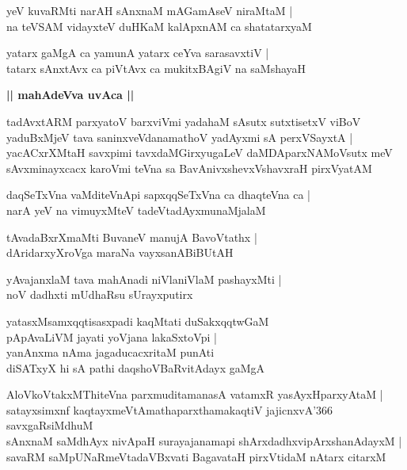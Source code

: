 \documentclass[twoside,12pt,openright]{book}
\newcounter{shloka}[chapter]
\def\uvaca#1{\centerline{{\large\textbf{#1}}}}
\begin{document}
\begin{shloka}%
yeV kuvaRMti narAH sAnxnaM mAGamAseV niraMtaM |\\
na teVSAM vidayxteV duHKaM kalApxnAM ca shatatarxyaM 
\end{shloka}

\begin{shloka}%
yatarx gaMgA ca yamunA yatarx ceYva sarasavxtiV |\\
tatarx sAnxtAvx ca piVtAvx ca mukitxBAgiV na saMshayaH 
\end{shloka}

\uvaca{|| mahAdeVva uvAca ||}

\begin{shloka}%
tadAvxtARM parxyatoV barxviVmi yadahaM sAsutx sutxtisetxV viBoV \\
yaduBxMjeV tava saninxveVdanamathoV yadAyxmi sA perxVSayxtA |\\
yacACxrXMtaH savxpimi tavxdaMGirxyugaLeV daMDAparxNAMoVsutx meV \\
sAvxminayxcacx karoVmi teVna sa BavAnivxshevxVshavxraH pirxVyatAM
\end{shloka}

\begin{shloka}%
daqSeTxVna vaMditeVnApi sapxqqSeTxVna ca dhaqteVna ca |\\
narA yeV na vimuyxMteV tadeVtadAyxmunaMjalaM 
\end{shloka}

\begin{shloka}%
tAvadaBxrXmaMti BuvaneV manujA BavoVtathx |\\
dAridarxyXroVga maraNa vayxsanABiBUtAH
\end{shloka}

\begin{shloka}%
yAvajanxlaM tava mahAnadi niVlaniVlaM pashayxMti |\\
noV dadhxti mUdhaRsu sUrayxputirx
\end{shloka}

\begin{shloka}%
yatasxMsamxqqtisasxpadi kaqMtati duSakxqqtwGaM \\
pApAvaLiVM jayati yoVjana lakaSxtoVpi |\\
yanAnxma nAma jagaducacxritaM punAti \\
diSATxyX hi sA pathi daqshoVBaRvitAdayx gaMgA
\end{shloka}

\begin{shloka}%
AloVkoVtakxMThiteVna parxmuditamanasA vatamxR yasAyxHparxyAtaM |\\
satayxsimxnf kaqtayxmeVtAmathaparxthamakaqtiV jajicnxvA\char'366 ~ savxgaRsiMdhuM \\
sAnxnaM saMdhAyx nivApaH surayajanamapi shArxdadhxvipArxshanAdayxM |\\
savaRM saMpUNaRmeVtadaVBxvati BagavataH pirxVtidaM nAtarx citarxM
\end{shloka}
\end{document}
